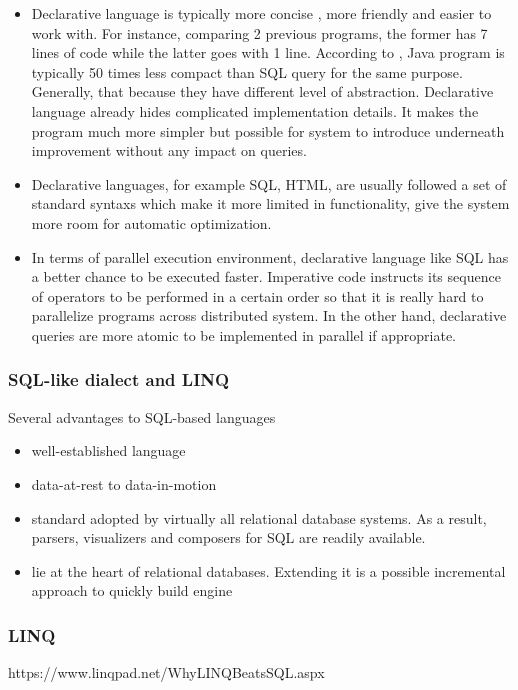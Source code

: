 \begin{itemize}
	\item Declarative language is typically more concise , more friendly and easier to work with. For instance, comparing 2 previous programs, the former has 7 lines of code while the latter goes with 1 line. According to \citep{Ronnie:2015}, Java program is typically 50 times less compact than SQL query for the same purpose. Generally, that because they have different level of abstraction. Declarative language already hides complicated implementation details. It makes the program much more simpler but possible for system to introduce underneath improvement without any impact on queries.
	\item Declarative languages, for example SQL, HTML,  are usually followed a set of standard syntaxs which make it more limited in functionality, give the system more room for automatic optimization. 
	\item In terms of parallel execution environment, declarative language like SQL has a better chance to be executed faster. Imperative code instructs its sequence of operators to be performed in a certain order so that it is really hard to parallelize programs across distributed system. In the other hand, declarative queries are more atomic to be implemented in parallel if appropriate.
\end{itemize}

\subsubsection*{SQL-like dialect and LINQ}
Several advantages to SQL-based languages \citep{Henrique:2014}
\begin{itemize}

	\item well-established language
	\item data-at-rest to data-in-motion
	\item standard adopted by virtually all relational database systems. As a result, parsers, visualizers and composers for SQL are readily available.
	\item lie at the heart of relational databases. Extending it is a possible incremental approach to quickly build engine

\end{itemize}
	
\subsubsection*{LINQ}
https://www.linqpad.net/WhyLINQBeatsSQL.aspx


